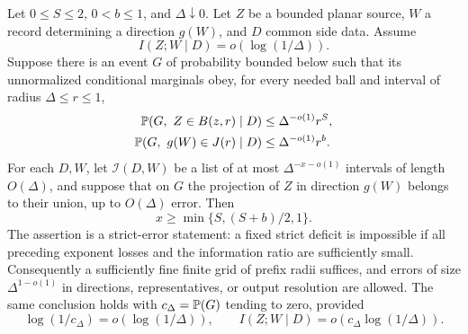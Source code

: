 \begin{proposition}
\label{names:projection-rule}
Let $0\le S\le2$, $0<b\le1$, and $\Delta\downarrow0$.  Let $Z$ be a
bounded planar source, $W$ a record determining a direction $g(W)$,
and $D$ common side data.  Assume
\begin{equation}
 I(Z;W\mid D)=o(\log(1/\Delta)).
 \label{names:score-projection-budget}
\end{equation}
Suppose there is an event $G$ of probability bounded below such that
its unnormalized conditional marginals obey, for every needed ball
and interval of radius $\Delta\le r\le1$,
\begin{align}
 \mathbb P(G,\ Z\in B(z,r)\mid D)&\le\Delta^{-o(1)}r^S,\notag\\
 \mathbb P(G,\ g(W)\in J(r)\mid D)&\le\Delta^{-o(1)}r^b.
 \label{names:score-projection-masses}
\end{align}
For each $D,W$, let $\mathcal I(D,W)$ be a list of at most
$\Delta^{-x-o(1)}$ intervals of length $O(\Delta)$, and suppose that on
$G$ the projection of $Z$ in direction $g(W)$ belongs to their union,
up to $O(\Delta)$ error.  Then
\begin{equation}
 x\ge\min\{S,(S+b)/2,1\}.
 \label{names:score-projection-conclusion}
\end{equation}
The assertion is a strict-error statement: a fixed strict deficit is
impossible if all preceding exponent losses and the information ratio
are sufficiently small.  Consequently a sufficiently fine finite grid
of prefix radii suffices, and errors of size
$\Delta^{1-o(1)}$ in directions, representatives, or output resolution
are allowed.
The same conclusion holds with $c_\Delta=\mathbb P(G)$ tending to zero,
provided
\[
 \log(1/c_\Delta)=o(\log(1/\Delta)),\qquad
 I(Z;W\mid D)=o(c_\Delta\log(1/\Delta)).
\]
\end{proposition}

